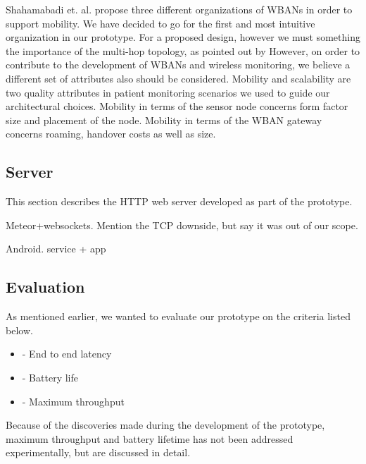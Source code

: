 Shahamabadi et. al. propose three different organizations of WBANs in order to support mobility. We have decided to go for the first and most intuitive organization in our prototype. For a proposed design, however we must something the importance of the multi-hop topology, as pointed out by 
However, on order to contribute to the development of WBANs and wireless monitoring, we believe a different set of attributes also should be considered. Mobility and scalability are two quality attributes in patient monitoring scenarios we used to guide our architectural choices. Mobility in terms of the sensor node concerns form factor size and placement of the node. Mobility in terms of the WBAN gateway concerns roaming, handover costs as well as size.



\subsection{Server} %
\label{sub:server}

This section describes the HTTP web server developed as part of the prototype. 

Meteor+websockets. Mention the TCP downside, but say it was out of our scope. 

Android. service + app


\subsection{Evaluation} %
\label{sub:evaluation}

As mentioned earlier, we wanted to evaluate our prototype on the criteria listed below.

\begin{itemize}
	\item - End to end latency
	\item - Battery life
	\item - Maximum throughput
\end{itemize}

Because of the discoveries made during the development of the prototype, maximum throughput and battery lifetime has not been addressed experimentally, but are discussed in detail.




